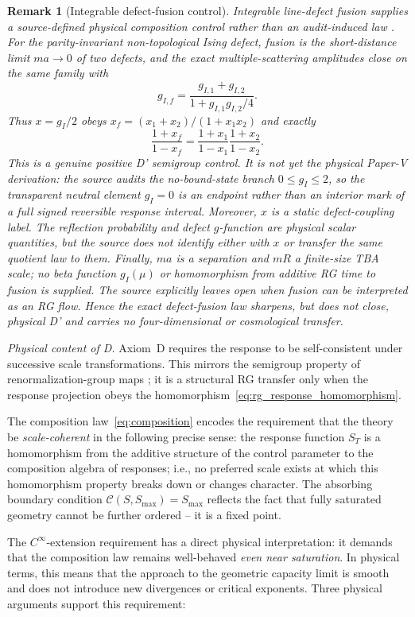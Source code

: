 \documentclass[aps,prd,twocolumn,superscriptaddress,nofootinbib]{revtex4-2}
\newtheorem{remark}{Remark}
\begin{document}
\begin{remark}[Integrable defect-fusion control]
Integrable line-defect fusion supplies a source-defined physical composition control rather than an audit-induced law \cite{HeJiangLiu2026,DelfinoMussardoSimonetti1994b}. For the parity-invariant non-topological Ising defect, fusion is the short-distance limit $ma\to0$ of two defects, and the exact multiple-scattering amplitudes close on the same family with
\[
 g_{I,f}=\frac{g_{I,1}+g_{I,2}}{1+g_{I,1}g_{I,2}/4}.
\]
Thus $x=g_I/2$ obeys $x_f=(x_1+x_2)/(1+x_1x_2)$ and exactly
\[
 \frac{1+x_f}{1-x_f}=\frac{1+x_1}{1-x_1}\frac{1+x_2}{1-x_2}.
\]
This is a genuine positive D' semigroup control. It is not yet the physical Paper-V derivation: the source audits the no-bound-state branch $0\leq g_I\leq2$, so the transparent neutral element $g_I=0$ is an endpoint rather than an interior mark of a full signed reversible response interval. Moreover, $x$ is a static defect-coupling label. The reflection probability and defect $g$-function are physical scalar quantities, but the source does not identify either with $x$ or transfer the same quotient law to them. Finally, $ma$ is a separation and $mR$ a finite-size TBA scale; no beta function $g_I(\mu)$ or homomorphism from additive RG time to fusion is supplied. The source explicitly leaves open when fusion can be interpreted as an RG flow. Hence the exact defect-fusion law sharpens, but does not close, physical D' and carries no four-dimensional or cosmological transfer.
\end{remark}

\textit{Physical content of D.} Axiom~D requires the response to be self-consistent under successive scale transformations. This mirrors the semigroup property of renormalization-group maps \cite{WilsonKogut1974}; it is a structural RG transfer only when the response projection obeys the homomorphism~\eqref{eq:rg_response_homomorphism}.

The composition law~\eqref{eq:composition} encodes the requirement that the theory be \textit{scale-coherent} in the following precise sense: the response function $S_T$ is a homomorphism from the additive structure of the control parameter to the composition algebra of responses; i.e., no preferred scale exists at which this homomorphism property breaks down or changes character. The absorbing boundary condition $\mathcal{C}(S, S_{\max}) = S_{\max}$ reflects the fact that fully saturated geometry cannot be further ordered -- it is a fixed point.

The $C^\infty$-extension requirement has a direct physical interpretation: it demands that the composition law remains well-behaved \textit{even near saturation}. In physical terms, this means that the approach to the geometric capacity limit is smooth and does not introduce new divergences or critical exponents. Three physical arguments support this requirement:
\end{document}
